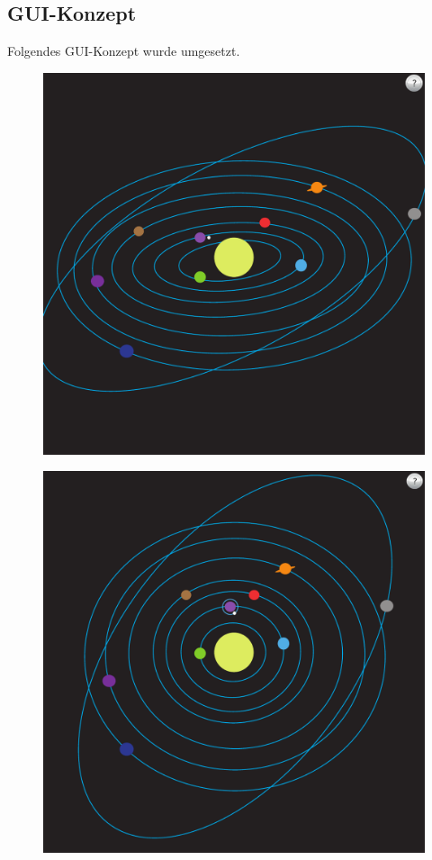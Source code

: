 \clearpage
\subsection{GUI-Konzept}
Folgendes GUI-Konzept wurde umgesetzt.

\begin{figure}[h]
\centering
\begin{minipage}{.5\textwidth}
  \centering
  \includegraphics[scale=0.4]{images/GUI-Concept_Planets_side.pdf}
  \label{fig:test1}
\end{minipage}%
\begin{minipage}{.5\textwidth}
  \centering
  \includegraphics[scale=0.4]{images/GUI-Concept_Planets_top.pdf}

\end{minipage}
\end{figure}
